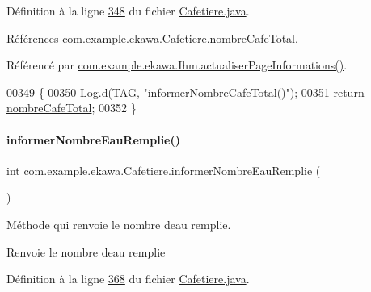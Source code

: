 Définition à la ligne \hyperlink{_cafetiere_8java_source_l00348}{348} du fichier \hyperlink{_cafetiere_8java_source}{Cafetiere.\+java}.



Références \hyperlink{_cafetiere_8java_source_l00098}{com.\+example.\+ekawa.\+Cafetiere.\+nombre\+Cafe\+Total}.



Référencé par \hyperlink{_ihm_8java_source_l00919}{com.\+example.\+ekawa.\+Ihm.\+actualiser\+Page\+Informations()}.


\begin{DoxyCode}
00349     \{
00350         Log.d(\hyperlink{classcom_1_1example_1_1ekawa_1_1_cafetiere_aa0c1fd99a2508b06c462aea17034aa91}{TAG}, \textcolor{stringliteral}{"informerNombreCafeTotal()"});
00351         \textcolor{keywordflow}{return} \hyperlink{classcom_1_1example_1_1ekawa_1_1_cafetiere_ac22f9da8ed59c7362871b8f22e501e23}{nombreCafeTotal};
00352     \}
\end{DoxyCode}
\mbox{\label{classcom_1_1example_1_1ekawa_1_1_cafetiere_a456c870bf52bcd639abdc299e50ddd73}} 
\paragraph{\texorpdfstring{informer\+Nombre\+Eau\+Remplie()}{informerNombreEauRemplie()}}
{\footnotesize\ttfamily int com.\+example.\+ekawa.\+Cafetiere.\+informer\+Nombre\+Eau\+Remplie (\begin{DoxyParamCaption}{ }\end{DoxyParamCaption})}



Méthode qui renvoie le nombre d\textquotesingle{}eau remplie. 

\begin{DoxyReturn}{Renvoie}
le nombre d\textquotesingle{}eau remplie 
\end{DoxyReturn}


Définition à la ligne \hyperlink{_cafetiere_8java_source_l00368}{368} du fichier \hyperlink{_cafetiere_8java_source}{Cafetiere.\+java}.



